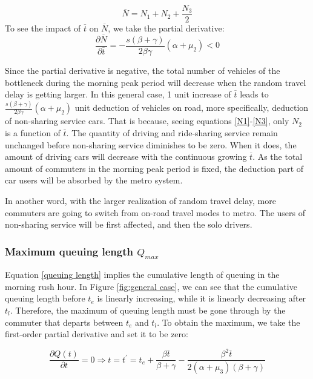 \documentclass[a4paper,11pt]{article}
\begin{document}
\begin{equation}
\overline{N} =N_1+N_2+\frac{N_3}{2}
\end{equation}\label{Total number of vehicles}
To see the impact of $\overline{t}$ on $\overline{N}$, we take the partial derivative:
\begin{equation}
\frac{\partial \overline{N}}{\partial \overline{t}} = -\frac{s(\beta+\gamma)}{2 \beta \gamma}\left(\alpha+\mu_2 \right) < 0
\end{equation} \label{partial Nba}

Since the partial derivative is negative, the total number of vehicles of the bottleneck during the morning peak period will decrease when the random travel delay is getting larger. In this general case, 1 unit increase of $\overline{t}$ leads to  $\frac{s(\beta+\gamma)}{2 \beta \gamma}\left(\alpha+\mu_2 \right)$  unit deduction of vehicles on road,  more specifically, deduction of non-sharing service cars. That is because, seeing equations \ref{N1}-\ref{N3},  only $N_2$ is a function of $\overline{t}$. The quantity of driving and ride-sharing service remain unchanged before non-sharing service diminishes to be zero.  When it does, the amount of driving cars will decrease with the continuous growing $\overline{t}$. As the total amount of commuters in the morning peak period is fixed, the deduction part of car users will be absorbed by the metro system.

In another word, with the larger realization of random travel delay, more commuters are going to switch from on-road travel modes to metro. The users of non-sharing service will be first affected, and then the solo drivers. 


\subsubsection{Maximum queuing length $Q_{max}$}\label{subsubs: Maximum queuing length}
Equation \ref{queuing length} implies the cumulative length of queuing in the morning rush hour. In Figure \ref{fig:general case}, we can see that the cumulative queuing length before $t_e$ is linearly increasing, while it is linearly decreasing after $t_l$. Therefore, the maximum of queuing length must be gone through by the commuter that departs between $t_e$ and $t_l$. To obtain the maximum, we take the first-order partial derivative and set it to be zero:

\begin{equation*} 
\frac{\partial Q(t)}{\partial t} = 0 \Rightarrow t = t^\prime= t_e+\frac{\beta \overline{t}}{\beta+\gamma} - \frac{\beta^2 \overline{t}}{2(\alpha+\mu_3)(\beta+\gamma)}
\end{equation*}
\end{document}
